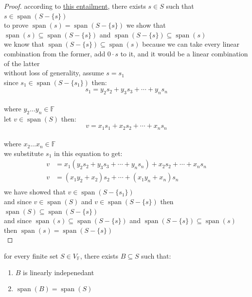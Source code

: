 \documentclass[a4paper,12pt]{article}
\DeclareMathOperator{\spn}{span}
\begin{document}
\begin{definition}
\begin{lemma}
\begin{proof}
according to \hyperref[org7800c26]{this entailment}, there exists \(s \in S\) such that \(s \in \spn(S - \{s\})\)\\
to prove \(\spn(s) = \spn(S - \{s\})\) we show that \(\spn(s) \subseteq \spn(S - \{s\})\) and \(\spn(S - \{s\}) \subseteq \spn(s)\)\\
we know that \(\spn(S - \{s\}) \subseteq \spn(s)\) because we can take every linear combination from the former, add \(0 \cdot s\) to it, and it would be a linear combination of the latter\\
without loss of generality, assume \(s = s_1\)\\
since \(s_1 \in \spn(S - \{s_1\})\) then:\\
\[
  s_1 = y_2s_2 + y_3s_3 + \cdots + y_ns_n
\]\\
where \(y_2\ldots y_n \in \mathbb{F}\)\\
let \(v \in \spn(S)\) then:\\
\[
  v = x_1s_1 + x_2s_2 + \cdots + x_ns_n
\]\\
where \(x_2\ldots x_n \in \mathbb{F}\)\\
we substitute \(s_1\) in this equation to get:\\
\begin{align*}
  v &= x_1(y_2s_2 + y_3s_3 + \cdots + y_ns_n) + x_2s_2 + \cdots + x_ns_n\\
  v &= (x_1y_2 + x_2)s_2 + \cdots + (x_1y_n + x_n)s_n\\
\end{align*}
we have showed that \(v \in \spn(S - \{s_1\})\)\\
and since \(v \in \spn(S)\) and \(v \in \spn(S - \{s\})\) then \(\spn(S) \subseteq \spn(S - \{s\})\)\\
and since \(\spn(s) \subseteq \spn(S - \{s\})\) and \(\spn(S - \{s\}) \subseteq \spn(s)\) then \(\spn(s) = \spn(S - \{s\})\)\\
\end{proof}
\label{orgd3163b2}
\end{lemma}

\begin{lemma}
for every finite set \(S \in V_\mathbb{F}\), there exists \(B \subseteq S\) such that:\\
\begin{enumerate}
\item \(B\) is linearly indepenedant\\
\item \(\spn(B) = \spn(S)\)\\
\end{enumerate}


\end{lemma}
\end{definition}
\end{document}

